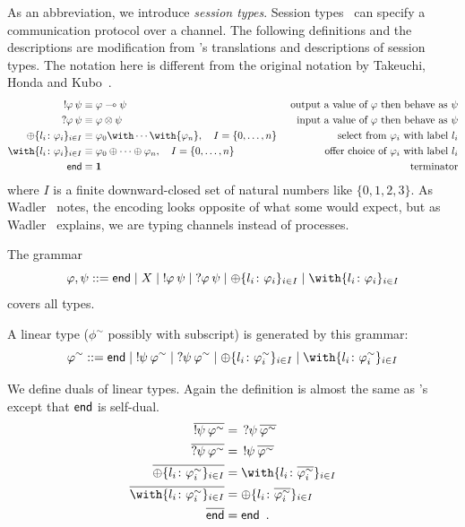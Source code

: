     As an abbreviation, we introduce \textit{session
    types}.
    Session types~\cite{interaction,honda-session} can specify a communication
    protocol over a channel.
    The following definitions and the descriptions are modification from
    \citet{wadler2012propositions}'s translations and descriptions of
    session types.  The notation here is different from the
    original notation by Takeuchi, Honda and Kubo~\citep{interaction}.
    \begin{align*}
     \sendtype\phi\psi&\equiv \phi\limp\psi &\text{
     output a value of $\phi$ then behave as $\psi$} \\
     \recvtype\phi\psi&\equiv \phi\otimes\psi &\text{input a value of
     $\phi$ then behave as $\psi$}\\
     \oplus\{l_i\colon \phi_i\}_{i\in I} &\equiv {\phi_0}\with
     \cdots \with {\phi_n}, \quad I = \{0,\ldots,n\} & \text{select from
     $\phi_i$ with label $l_i$}\\
     \with\{l_i\colon \phi_i\}_{i\in I} &\equiv {\phi_0}\oplus
     \cdots \oplus {\phi_n}, \quad I = \{0,\ldots,n\}& \text{offer choice of
     $\phi_i$ with label $l_i$}
     \\
     \terminate &\equiv \one &\text{terminator}
    \end{align*}
    where $I$ is a finite downward-closed set of natural numbers like
    $\{0,1,2,3\}$.
    As Wadler~\citep{wadler2012propositions} notes, the encoding looks
    opposite of what some would expect, but as
    Wadler~\citep{wadler2012propositions} explains, we are
    typing channels instead of processes.

    The grammar
    \[
     \phi,\psi ::= \terminate\mid X \mid \sendtype\phi\psi \mid
     \recvtype\phi\psi
     \mid \oplus\{l_i\colon\phi_i\}_{i\in I}
     \mid \with\{l_i\colon\phi_i\}_{i\in I}
    \]
    covers all types.

    A linear type ($\phi^\sim$ possibly with subscript) is generated by
    this grammar:
    \[
     \phi^\sim ::= \terminate\mid
     \sendtype{\psi}{\phi^\sim} \mid
     \recvtype{\psi}{\phi^\sim}
     \mid \oplus\{l_i\colon\phi^\sim_i\}_{i\in I}
     \mid \with\{l_i\colon\phi^\sim_i\}_{i\in I}
    \]

    We define duals of linear types.
    Again the definition is almost the
    same as \citet{wadler2012propositions}'s except that $\mathsf{end}$ is
    self-dual.
    \begin{align*}
     \overline{\sendtype\psi{\phi^\sim}}&= \,\recvtype\psi{\overline{\phi^\sim}}\\
     \overline{\recvtype\psi{\phi^\sim}}&= \,\sendtype\psi{\overline{\phi^\sim}}\\
     \overline{\oplus\{l_i\colon \phi^\sim_i\}_{i\in I}} &=
     \with\{l_i\colon \overline{\phi^\sim_i}\}_{i\in I} \\
     \overline{\with\{l_i\colon \phi^\sim_i\}_{i\in I}} &=
     \oplus\{l_i\colon \overline{\phi^\sim_i}\}_{i\in I} \\
     \overline{\terminate} &= \terminate\enspace.
    \end{align*}

